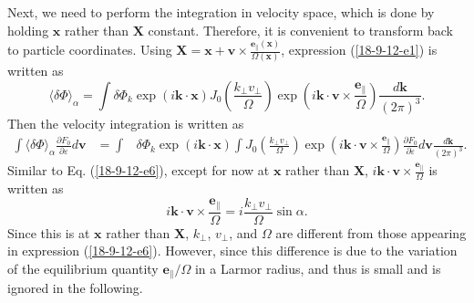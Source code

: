 \documentclass{article}
\begin{document}
Next, we need to perform the integration in velocity space, which is done by
holding $\mathbf{x}$ rather than $\mathbf{X}$ constant. Therefore, it is
convenient to transform back to particle coordinates. Using
$\mathbf{X}=\mathbf{x}+\mathbf{v} \times \frac{\mathbf{e}_{\parallel}
(\mathbf{x})}{\Omega (\mathbf{x})}$, expression (\ref{18-9-12-e1}) is written
as
\begin{equation}
  \langle \delta \Phi \rangle_{\alpha} = \int \delta \Phi_k \exp (i\mathbf{k}
  \cdot \mathbf{x}) J_0 \left( \frac{k_{\perp} v_{\perp}}{\Omega} \right) \exp
  \left( i\mathbf{k} \cdot \mathbf{v} \times
  \frac{\mathbf{e}_{\parallel}}{\Omega} \right) \frac{d\mathbf{k}}{(2 \pi)^3}
  .
\end{equation}
Then the velocity integration is written as
\begin{eqnarray}
  \int \langle \delta \Phi \rangle_{\alpha} \frac{\partial F_0}{\partial
  \varepsilon} d\mathbf{v} & = \int & \delta \Phi_k \exp (i\mathbf{k} \cdot
  \mathbf{x}) \int J_0 \left( \frac{k_{\perp} v_{\perp}}{\Omega} \right) \exp
  \left( i\mathbf{k} \cdot \mathbf{v} \times
  \frac{\mathbf{e}_{\parallel}}{\Omega} \right) \frac{\partial F_0}{\partial
  \varepsilon} d\mathbf{v} \frac{d\mathbf{k}}{(2 \pi)^3} .  \label{18-9-12-e5}
\end{eqnarray}
Similar to Eq. (\ref{18-9-12-e6}), except for now at $\mathbf{x}$ rather than
$\mathbf{X}$, $i\mathbf{k} \cdot \mathbf{v} \times
\frac{\mathbf{e}_{\parallel}}{\Omega}$ is written as
\begin{equation}
  \label{18-9-13-p4} i\mathbf{k} \cdot \mathbf{v} \times
  \frac{\mathbf{e}_{\parallel}}{\Omega} = i \frac{k_{\perp} v_{\perp}}{\Omega}
  \sin \alpha .
\end{equation}
Since this is at $\mathbf{x}$ rather than $\mathbf{X}$, $k_{\perp}$,
$v_{\perp}$, and $\Omega$ are different from those appearing in expression
(\ref{18-9-12-e6}). However, since this difference is due to the variation of
the equilibrium quantity $\mathbf{e}_{\parallel} / \Omega$ in a Larmor radius,
and thus is small and is ignored in the following.
\end{document}
